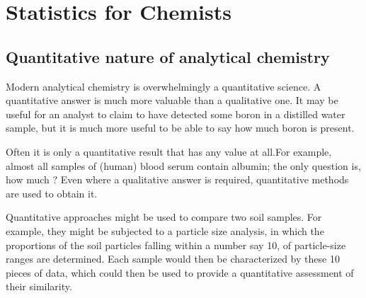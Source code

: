 %
%
%
%

\newpage
\chapter{Statistics for Chemists}

\section{Quantitative nature of analytical chemistry}
Modern analytical chemistry is overwhelmingly a quantitative science.
A quantitative answer is much more valuable than a qualitative one.
It may be useful for an analyst to claim to have detected some boron in a
distilled water sample, but it is much more useful to be able to say how
much boron is present.

Often it is only a quantitative result that has any value at all.For
example, almost all samples of (human) blood serum contain albumin;
the only question is, how much ? Even where a qualitative answer is required, quantitative methods are
used to obtain it.

Quantitative approaches might be used to compare two soil samples. For example, they might be subjected to a particle
size analysis, in which the proportions of the soil particles falling within a number say 10, of particle-size ranges are determined. Each sample would then be characterized by these 10 pieces of data, which could
then be used to provide a quantitative assessment of their similarity.

